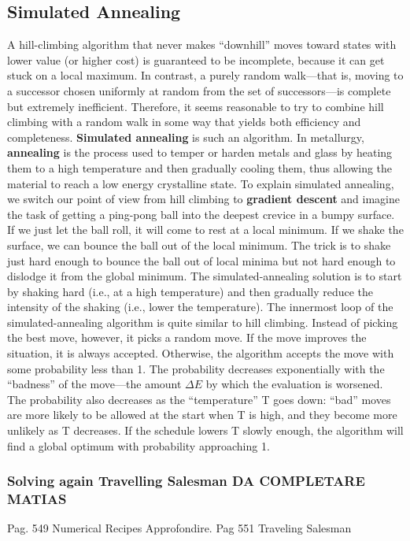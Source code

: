 \subsection{Simulated Annealing}
A hill-climbing algorithm that never makes “downhill” moves toward states with lower value (or higher cost) is guaranteed to be incomplete, because it can get stuck on a local maximum.
In contrast, a purely random walk—that is, moving to a successor chosen uniformly at random from the set of successors—is complete but extremely inefficient. Therefore, it seems reasonable to try to combine hill climbing with a random walk in some way that yields
both efficiency and completeness.
\textbf{Simulated annealing} is such an algorithm. In metallurgy, \textbf{annealing} is the process used to temper or harden metals and glass by heating them to a high temperature and then gradually cooling them, thus allowing the material to reach a low energy crystalline state. To explain simulated annealing, we switch our point of view from hill climbing to \textbf{gradient descent} and imagine the task of getting a ping-pong ball into the deepest crevice in a bumpy surface. If we just let the ball roll, it will come to rest at a local minimum. If we shake the surface, we can bounce the ball out of the local minimum. The trick is to shake just hard enough to bounce the ball out of local minima but not hard enough to dislodge it from the global minimum. The simulated-annealing solution is to start by shaking hard (i.e., at a high temperature) and then gradually reduce the intensity of the shaking (i.e., lower the temperature).
The innermost loop of the simulated-annealing algorithm is quite similar to hill climbing. Instead of picking the best move, however, it picks a random move. If the move
improves the situation, it is always accepted. Otherwise, the algorithm accepts the move with some probability less than 1. The probability decreases exponentially with the “badness” of the move—the amount $\Delta E$ by which the evaluation is worsened.
The probability also decreases as the “temperature” T goes down: “bad” moves are more likely to be allowed at the start when T is high, and they become more unlikely as T decreases. If the schedule lowers T slowly enough, the algorithm will find a global optimum with probability approaching 1.

\subsubsection{Solving again Travelling Salesman DA COMPLETARE MATIAS}
Pag. 549 Numerical Recipes Approfondire.
Pag 551 Traveling Salesman

